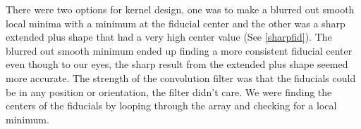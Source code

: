 \documentclass[10pt]{scrartcl}
\begin{document}
\begin{figure}[!ht]
\end{figure}


There were two options for kernel design, one was to make a blurred out smooth local minima with a minimum at the fiducial center and the other was a sharp extended plus shape that had a very high center value (See \cref{sharpfid}). The blurred out smooth minimum ended up finding a more consistent fiducial center even though to our eyes, the sharp result from the extended plus shape seemed more accurate. The strength of the convolution filter was that the fiducials could be in any position or orientation, the filter didn't care. We were finding the centers of the fiducials by looping through the array and checking for a local minimum. \\
\end{document}

